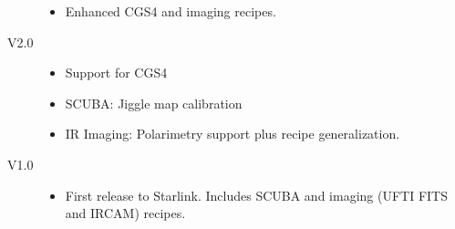 \documentclass[twoside,11pt]{article}
\renewcommand{\_}{\texttt{\symbol{95}}}
\begin{document}
\begin{description}
\begin{itemize}
\item Enhanced CGS4 and imaging recipes.

\end{itemize}

\item[V2.0]

\begin{itemize}

\item Support for CGS4

\item SCUBA: Jiggle map calibration

\item IR Imaging: Polarimetry support plus recipe generalization.

\end{itemize}

\item[V1.0]

\begin{itemize}

\item First release to Starlink. Includes SCUBA and imaging (UFTI FITS
and IRCAM) recipes.

\end{itemize}

\end{description}


\appendix










\end{document}
